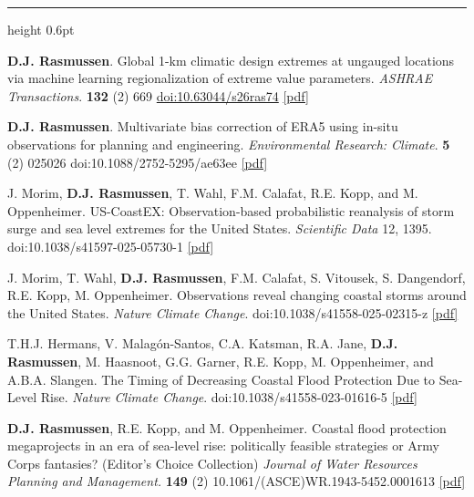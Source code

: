 \documentclass[10.5pt]{article}
\newcommand{\cvsection}[1]{%
  \par\addvspace{12pt}\pagebreak[3]%
  {\sffamily\bfseries\small\textls[80]{\MakeUppercase{#1}}}%
  \par\vspace{2pt}%
  {\color{rulegray}\hrule height 0.6pt}%
  \vspace{5pt}\nopagebreak}
\renewcommand{\section}[1]{\cvsection{#1}}
\newcommand{\yr}[1]{{\sffamily\bfseries #1}}
\begin{document}
\section{Journal Articles}
\begin{entries}
\item[\yr{2026}] \textbf{D.J. Rasmussen}. Global 1-km climatic design extremes at ungauged locations via machine learning regionalization of extreme value parameters. \emph{ASHRAE Transactions}. \textbf{132} (2) 669 \href{https://doi.org/10.63044/s26ras74}{doi:10.63044/s26ras74} \href{https://djrasmussen.co/assets/papers/Rasmussen_ASHRAE26_Global1km_DesignExtremes.pdf}{[pdf]}
\item[\yr{2026}] \textbf{D.J. Rasmussen}. Multivariate bias correction of ERA5 using in-situ observations for planning and engineering. \emph{Environmental Research: Climate}. \textbf{5} (2) 025026 doi:10.1088/2752-5295/ae63ee \href{https://iopscience.iop.org/article/10.1088/2752-5295/ae63ee/pdf}{[pdf]}
\item[\yr{2025}] J. Morim, \textbf{D.J. Rasmussen}, T. Wahl, F.M. Calafat, R.E. Kopp, and M. Oppenheimer. US-CoastEX: Observation-based probabilistic reanalysis of storm surge and sea level extremes for the United States. \emph{Scientific Data} 12, 1395. doi:10.1038/s41597-025-05730-1 \href{https://www.nature.com/articles/s41597-025-05730-1.pdf}{[pdf]}
\item[\yr{2025}] J. Morim, T. Wahl, \textbf{D.J. Rasmussen}, F.M. Calafat, S. Vitousek, S. Dangendorf, R.E. Kopp, M. Oppenheimer. Observations reveal changing coastal storms around the United States. \emph{Nature Climate Change}. doi:10.1038/s41558-025-02315-z \href{https://www.nature.com/articles/s41558-025-02315-z}{[pdf]}
\item[\yr{2023}] T.H.J. Hermans, V. Malagón-Santos, C.A. Katsman, R.A. Jane, \textbf{D.J. Rasmussen}, M. Haasnoot, G.G. Garner, R.E. Kopp, M. Oppenheimer, and A.B.A. Slangen. The Timing of Decreasing Coastal Flood Protection Due to Sea-Level Rise. \emph{Nature Climate Change}. doi:10.1038/s41558-023-01616-5 \href{https://www.nature.com/articles/s41558-023-01616-5}{[pdf]}
\item[\yr{2023}] \textbf{D.J. Rasmussen}, R.E. Kopp, and M. Oppenheimer. Coastal flood protection megaprojects in an era of sea-level rise: politically feasible strategies or Army Corps fantasies? (Editor's Choice Collection) \emph{Journal of Water Resources Planning and Management.} \textbf{149} (2) 10.1061/(ASCE)WR.1943-5452.0001613 \href{https://ascelibrary.org/doi/10.1061/%28ASCE%29WR.1943-5452.0001613}{[pdf]}

\end{entries}
\end{document}
